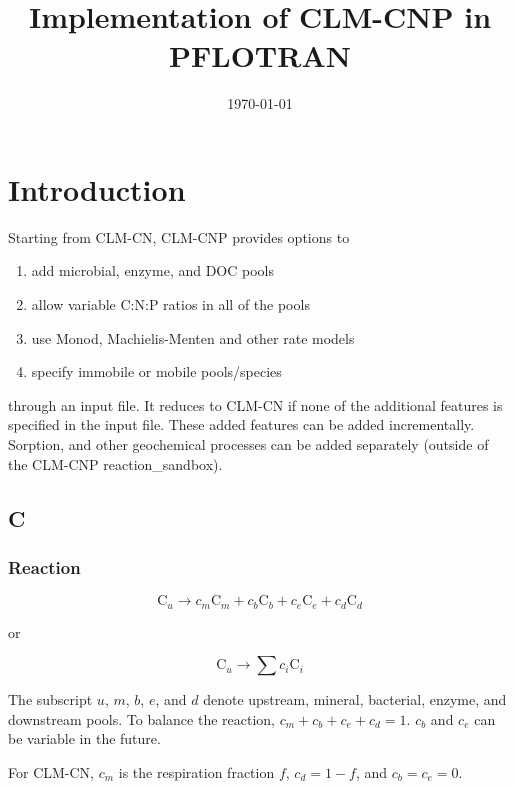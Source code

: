\documentclass[12pt, a4paper]{article}
\title{Implementation of CLM-CNP in PFLOTRAN}
\date\today{}
\begin{document}
\maketitle

\begin{abstract}
\end{abstract}

\section{Introduction}
Starting from CLM-CN, CLM-CNP provides options to
\begin{enumerate}
\item add microbial, enzyme, and DOC pools
\item allow variable C:N:P ratios in all of the pools
\item use Monod, Machielis-Menten and other rate models
\item specify immobile or mobile pools/species
\end{enumerate}

through an input file. It reduces to CLM-CN if none of the additional features is specified in the input file. These added features can be added incrementally. Sorption, and other geochemical processes can be added separately (outside of the CLM-CNP reaction\_sandbox).

\subsection{C}
\subsubsection{Reaction}
\begin{equation}
\label{rxnc}
\text{C}_u \rightarrow c_m\text{C}_m + c_b\text{C}_b + c_e \text{C}_e + c_d \text{C}_d
\end{equation}

or

\begin{equation}
\text{C}_u \rightarrow \sum c_i\text{C}_i
\end{equation}

The subscript $u$, $m$, $b$, $e$, and $d$ denote upstream, mineral, bacterial, enzyme, and downstream pools. To balance the reaction, $c_m + c_b + c_e + c_d = 1$. $c_b$ and $c_e$ can be variable in the future.

For CLM-CN, $c_m$ is the respiration fraction $f$, $c_d = 1 - f$, and $c_b = c_e = 0$.
\end{document}
